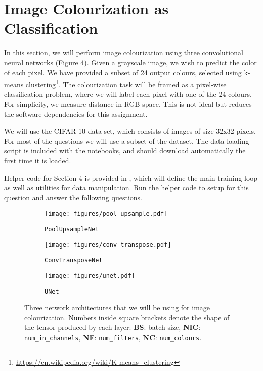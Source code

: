 \section*{Image Colourization as Classification}

In this section, we will perform image colourization using three convolutional neural networks (Figure \ref{fig:colourization-nets}). 
Given a grayscale image, we wish to predict the color of each pixel. 
We have provided a subset of 24 output colours, selected using k-means clustering\footnote{\url{https://en.wikipedia.org/wiki/K-means\_clustering}}. 
The colourization task will be framed as a pixel-wise classification problem, where we will label each pixel with one of the 24 colours. 
For simplicity, we measure distance in RGB space. 
This is not ideal but reduces the software dependencies for this assignment. 
    
We will use the CIFAR-10 data set, which consists of images of size 32x32 pixels. 
For most of the questions we will use a subset of the dataset. 
The data loading script is included with the notebooks, and should download automatically the first time it is loaded.
    
Helper code for Section 4 is provided in \submitCodeFile, which will define the main training loop as well as utilities for data manipulation. 
Run the helper code to setup for this question and answer the following questions.

\begin{figure}[htbp]
  \centering
  \begin{subfigure}[b]{0.3\textwidth}
    \centering
    \texttt{[image: figures/pool-upsample.pdf]}
    \caption{\texttt{PoolUpsampleNet}}
    \label{fig:pool-upsample-net}
  \end{subfigure}
  \hfill
  \begin{subfigure}[b]{0.3\textwidth}
    \centering
    \texttt{[image: figures/conv-transpose.pdf]}
    \caption{\texttt{ConvTransposeNet}}
    \label{fig:conv-transpose-net}
  \end{subfigure}
  \hfill
  \begin{subfigure}[b]{0.3\textwidth}
    \centering
    \texttt{[image: figures/unet.pdf]}
    \caption{\texttt{UNet}}
    \label{fig:unet}
  \end{subfigure}
  \caption{Three network architectures that we will be using for image colourization. Numbers inside square brackets denote the shape of the tensor produced by each layer: \textbf{BS}: batch size, \textbf{NIC}: \texttt{num\_in\_channels}, \textbf{NF}: \texttt{num\_filters}, \textbf{NC}: \texttt{num\_colours}.}
  \label{fig:colourization-nets}
\end{figure}

